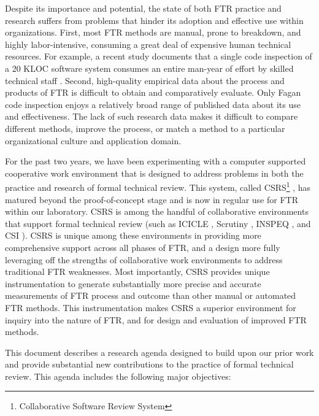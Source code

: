Despite its importance and potential, the state of both FTR practice and
research suffers from problems that hinder its adoption and effective use
within organizations.  First, most FTR methods are manual, prone to
breakdown, and highly labor-intensive, consuming a great deal of expensive
human technical resources. For example, a recent study documents that a
single code inspection of a 20 KLOC software system consumes an entire
man-year of effort by skilled technical staff \cite{Russell91}.  Second,
high-quality empirical data about the process and products of FTR is
difficult to obtain and comparatively evaluate.  Only Fagan code inspection
enjoys a relatively broad range of published data about its use and
effectiveness.  The lack of such research data makes it difficult to
compare different methods, improve the process, or match a method to a
particular organizational culture and application domain.

For the past two years, we have been experimenting with a computer
supported cooperative work environment that is designed to address problems
in both the practice and research of formal technical review.  This system,
called CSRS\footnote{Collaborative Software Review System}
\cite{csdl-92-07,csdl-93-07}, has matured beyond the proof-of-concept stage
and is now in regular use for FTR within our laboratory.  CSRS is among the
handful of collaborative environments that support formal technical review
(such as ICICLE \cite{Brothers90}, Scrutiny \cite{Gintell93}, INSPEQ
\cite{Knight91}, and CSI \cite{Mashayekhi93}).  CSRS is unique among these
environments in providing more comprehensive support across all phases of
FTR, and a design more fully leveraging off the strengths of collaborative
work environments to address traditional FTR weaknesses. Most importantly,
CSRS provides unique instrumentation to generate substantially more precise
and accurate measurements of FTR process and outcome than other manual or
automated FTR methods.  This instrumentation makes CSRS a superior
environment for inquiry into the nature of FTR, and for design and
evaluation of improved FTR methods.

This document describes a research agenda designed to build upon our prior
work and provide substantial new contributions to the practice of formal
technical review.  This agenda includes the following major objectives:

